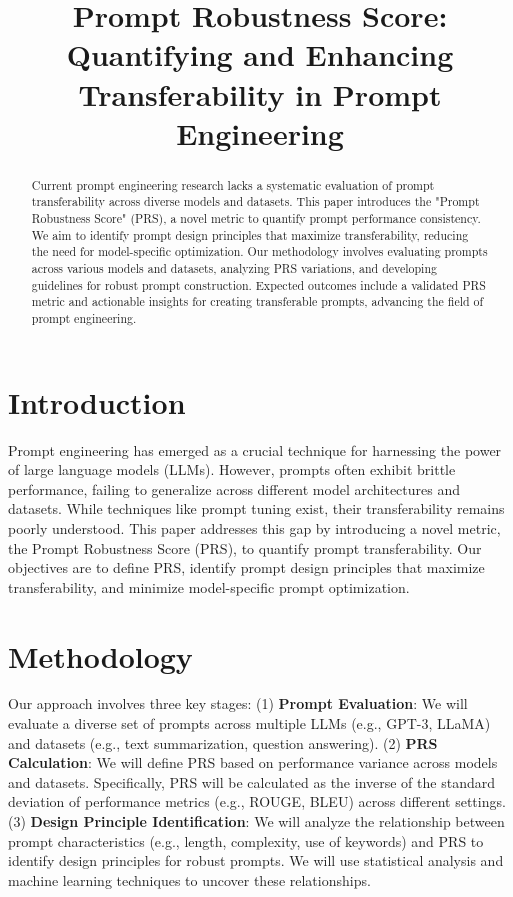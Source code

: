 \documentclass{article}
\title{Prompt Robustness Score: Quantifying and Enhancing Transferability in Prompt Engineering}
\author{}
\date{}
\begin{document}
\maketitle

\begin{abstract}
Current prompt engineering research lacks a systematic evaluation of prompt transferability across diverse models and datasets. This paper introduces the "Prompt Robustness Score" (PRS), a novel metric to quantify prompt performance consistency. We aim to identify prompt design principles that maximize transferability, reducing the need for model-specific optimization. Our methodology involves evaluating prompts across various models and datasets, analyzing PRS variations, and developing guidelines for robust prompt construction. Expected outcomes include a validated PRS metric and actionable insights for creating transferable prompts, advancing the field of prompt engineering.
\end{abstract}

\section{Introduction}
Prompt engineering has emerged as a crucial technique for harnessing the power of large language models (LLMs). However, prompts often exhibit brittle performance, failing to generalize across different model architectures and datasets. While techniques like prompt tuning exist, their transferability remains poorly understood. This paper addresses this gap by introducing a novel metric, the Prompt Robustness Score (PRS), to quantify prompt transferability. Our objectives are to define PRS, identify prompt design principles that maximize transferability, and minimize model-specific prompt optimization.

\section{Methodology}
Our approach involves three key stages: (1) \textbf{Prompt Evaluation}: We will evaluate a diverse set of prompts across multiple LLMs (e.g., GPT-3, LLaMA) and datasets (e.g., text summarization, question answering). (2) \textbf{PRS Calculation}: We will define PRS based on performance variance across models and datasets. Specifically, PRS will be calculated as the inverse of the standard deviation of performance metrics (e.g., ROUGE, BLEU) across different settings. (3) \textbf{Design Principle Identification}: We will analyze the relationship between prompt characteristics (e.g., length, complexity, use of keywords) and PRS to identify design principles for robust prompts. We will use statistical analysis and machine learning techniques to uncover these relationships.
\end{document}

